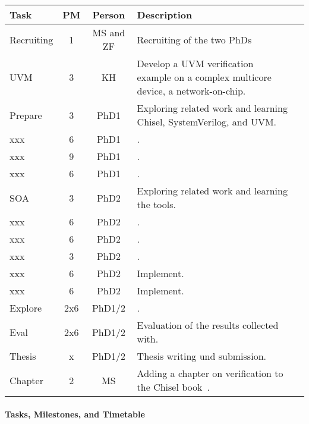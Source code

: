 \documentclass[fleqn,12pt]{article}
\begin{document}
\begin{table*}%
{\small
  \begin{center}
    \begin{tabular}{lccp{110mm}l}
      \toprule
      Task          & PM  & Person &  Description \\
      \midrule
      Recruiting  & 1 & MS and ZF & Recruiting of the two PhDs \\
      \midrule
      UVM     &  3      & KH     & Develop a UVM verification example on a complex multicore device, a network-on-chip.\\
      Prepare  & 3      & PhD1     &  Exploring related work and learning Chisel, SystemVerilog, and UVM. \\
      xxx     &  6      & PhD1     & .\\
      xxx    &  9      & PhD1     & .\\
      xxx     &  6      & PhD1     & .\\
      \midrule
      SOA  & 3      & PhD2     &  Exploring related work and learning the tools. \\
      xxx  & 6      & PhD2     &  . \\
      xxx  & 6      & PhD2     &  . \\
      xxx  & 3      & PhD2     &  . \\
      xxx  & 6      & PhD2     &  Implement. \\
      xxx  & 6      & PhD2     &  Implement. \\
      \midrule
      Explore   &    2x6 & PhD1/2    &  .\\
      Eval & 2x6 & PhD1/2 & Evaluation of the results collected with. \\
      Thesis & x & PhD1/2 & Thesis writing und submission.\\
      \midrule
      Chapter & 2 & MS & Adding a chapter on verification to the Chisel book~\cite{chisel:book}. \\
      \bottomrule
    \end{tabular}
  \end{center}
}
\end{table*}

\paragraph*{Tasks, Milestones, and Timetable}
\end{document}
